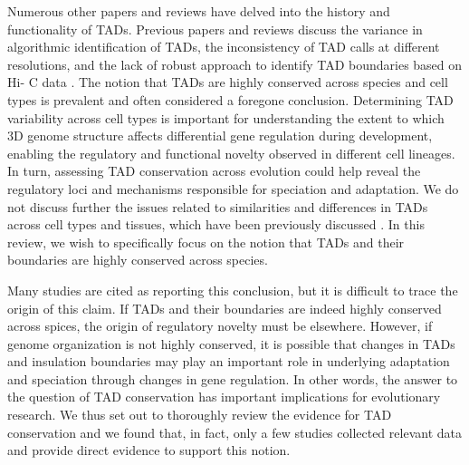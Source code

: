 Numerous other papers and reviews have delved into the history and functionality of TADs. Previous papers and reviews discuss the variance in algorithmic identification of TADs, the inconsistency of TAD calls at different resolutions, and the lack of robust approach to identify TAD boundaries based on Hi- C data \cite{Dixon.2016, Beagan.2020, Dali.2017, Forcato.2017, Zufferey.2018, Sikorska.2019, Andrey.2017, Franke.2018, Schoenfelder.2019, Rowley.2018, Fraser.2015, Ay.2015}. The notion that TADs are highly conserved across species and cell types is prevalent and often considered a foregone conclusion. Determining TAD variability across cell types is important for understanding the extent to which 3D genome structure affects differential gene regulation during development, enabling the regulatory and functional novelty observed in different cell lineages. In turn, assessing TAD conservation across evolution could help reveal the regulatory loci and mechanisms responsible for speciation and adaptation. We do not discuss further the issues related to similarities and differences in TADs across cell types and tissues, which have been previously discussed \cite{Andrey.2017, Sauerwald.2018, Sauerwald.2019, Schmitt.2016, Zheng.2019, Bonev.2016, Cubenas-potts.2015}. In this review, we wish to specifically focus on the notion that TADs and their boundaries are highly conserved across species.

Many studies are cited as reporting this conclusion, but it is difficult to trace the origin of this claim. If TADs and their boundaries are indeed highly conserved across spices, the origin of regulatory novelty must be elsewhere. However, if genome organization is not highly conserved, it is possible that changes in TADs and insulation boundaries may play an important role in underlying adaptation and speciation through changes in gene regulation. In other words, the answer to the question of TAD conservation has important implications for evolutionary research. We thus set out to thoroughly review the evidence for TAD conservation and we found that, in fact, only a few studies collected relevant data and provide direct evidence to support this notion.

